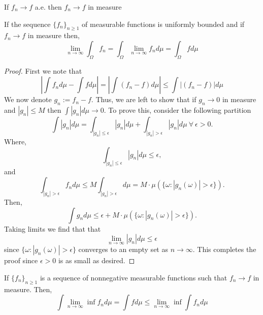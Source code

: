\documentclass[../TGMAFFIRO.tex]{subfiles}
\begin{document}

\begin{proposition} \label{prop:convergence_ae_measure}
	If $f_n \to f$ a.e. then $f_n \to f$ in measure
\end{proposition}

\begin{theorem}
	If the sequence $\{f_n\}_{n\geq 1}$ of measurable functions is uniformly bounded and if $f_n \to f$ in measure then,
	\begin{equation}
		\lim_{n\to\infty} \int_\Omega f_n = 	\int_\Omega \lim_{n\to\infty} f_n d\mu = \int_\Omega f d\mu
	\end{equation}
\end{theorem}

\begin{proof}
	First we note that
	\[
		|\int f_n d\mu - \int f d\mu| = |\int (f_n - f) d\mu| \leq \int| (f_n - f) | d\mu
	\]
	We now denote $g_n := f_n - f$. Thus, we are left to show that if $g_n \to 0$ in measure and $|g_n| \leq M$ then $\int |g_n| d\mu \to 0$. To prove this, consider the following partition
	\[
		\int|g_n| d\mu = \int_{|g_n| \leq \epsilon}|g_n| d\mu + \int_{|g_n| > \epsilon}|g_n| d\mu \ \forall \ \epsilon > 0.
	\]
	Where,
	\[
		\int_{|g_n| \leq \epsilon} |g_n| d\mu \leq \epsilon,
	\]
	and
	\[
		\int_{|g_n| > \epsilon} f_n d\mu \leq M\int_{|g_n| > \epsilon} d\mu = M\cdot\mu(\{\omega : |g_n(\omega)| > \epsilon\}).
	\]
	Then,
	\begin{equation}
		\int g_n d\mu \leq \epsilon + M\cdot\mu(\{\omega : |g_n(\omega)| > \epsilon\}).
	\end{equation}
	Taking limits we find that that
	\[
		\lim_{n\to\infty} |g_n| d\mu \leq \epsilon
	\]
	since $\{\omega : |g_n(\omega)| > \epsilon\}$ converges to an empty set as $n\to\infty$. This completes the proof since $\epsilon > 0$ is as small as desired.
\end{proof}

\begin{theorem}\label{th:fatous_lemma}
If $\{f_n\}_{n\geq 1}$ is a sequence of nonnegative measurable functions such that $f_n \to f$ in measure. Then,
\begin{equation}
	\int\lim_{n\to\infty}\inf f_n d\mu = \int f d\mu \leq \lim_{n\to\infty}\inf\int f_n d\mu
\end{equation}
\end{theorem}
\end{document}
